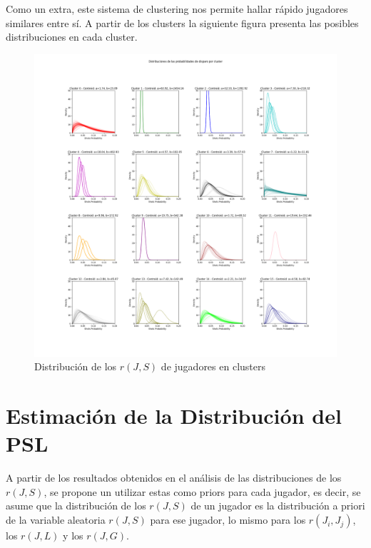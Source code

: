\documentclass[
  a4paper,
]{article}
\begin{document}
Como un extra, este sistema de clustering nos permite hallar rápido
jugadores similares entre sí. A partir de los clusters la siguiente
figura presenta las posibles distribuciones en cada cluster.

\begin{figure}
  \includegraphics{recursos_pdf/graficos/Clusters_of_Players_shots_prob_beta_binomial_distributions.png}
    \caption{Distribución de los $r(J, S)$ de jugadores en clusters}
\end{figure}

\newpage

\hypertarget{estimaciuxf3n-de-la-distribuciuxf3n-del-psl}{%
\section{\texorpdfstring{\textbf{Estimación de la Distribución del
PSL}}{Estimación de la Distribución del PSL}}\label{estimaciuxf3n-de-la-distribuciuxf3n-del-psl}}

A partir de los resultados obtenidos en el análisis de las
distribuciones de los \(r(J, S)\), se propone un utilizar estas como
priors para cada jugador, es decir, se asume que la distribución de los
\(r(J, S)\) de un jugador es la distribución a priori de la variable
aleatoria \(r(J, S)\) para ese jugador, lo mismo para los
\(r(J_i, J_j)\), los \(r(J, L)\) y los \(r(J, G)\).
\end{document}
